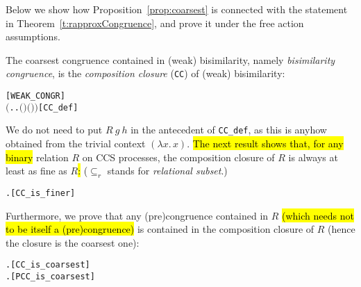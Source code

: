 Below we show how Proposition~\ref{prop:coarsest} is connected with
the statement in Theorem~\ref{t:rapproxCongruence}, and prove it under
the free action assumptions.

The coarsest congruence
contained in (weak) bisimilarity, namely \emph{bisimilarity
  congruence}, is
the \emph{composition closure} (\texttt{CC}) of (weak) bisimilarity:
\begin{alltt}
    \HOLSymConst{\HOLTokenDefEquality{}}  \hfill{[WEAK_CONGR]}
     \HOLSymConst{\HOLTokenDefEquality{}} \ensuremath{(}\HOLTokenLambda{} . \HOLSymConst{\HOLTokenForall{}}.   \HOLSymConst{\HOLTokenImp{}}  \ensuremath{(} \ensuremath{)} \ensuremath{(} \ensuremath{)}\ensuremath{)}\hfill{[CC_def]}
\end{alltt}
We do not need to put $R\ g\ h$ in the antecedent of
  \texttt{CC\_def}, as this is anyhow obtained from the trivial context $(\lambda x.\,x)$.
\hl{The next result shows that, for any binary} relation $R$ 
on CCS processes, the composition closure of $R$ is always at least as
fine as $R$\hl{:} ($\subseteq_r$ stands for \emph{relational subset}.)
\begin{alltt}
\HOLTokenTurnstile{} \HOLSymConst{\HOLTokenForall{}}.   \HOLSymConst{\HOLTokenRSubset{}} \hfill{[CC_is_finer]}
\end{alltt}
Furthermore, we prove that any (pre)congruence contained in $R$
\hl{(which needs not to be itself a (pre)congruence)}
is contained in the composition closure of $R$
(hence the closure is the coarsest one):
\begin{alltt}
\HOLTokenTurnstile{} \HOLSymConst{\HOLTokenForall{}} .   \HOLSymConst{\HOLTokenConj{}}  \HOLSymConst{\HOLTokenRSubset{}}  \HOLSymConst{\HOLTokenImp{}}  \HOLSymConst{\HOLTokenRSubset{}}  \hfill{[CC_is_coarsest]}
\HOLTokenTurnstile{} \HOLSymConst{\HOLTokenForall{}} .   \HOLSymConst{\HOLTokenConj{}}  \HOLSymConst{\HOLTokenRSubset{}}  \HOLSymConst{\HOLTokenImp{}}  \HOLSymConst{\HOLTokenRSubset{}}  \hfill{[PCC_is_coarsest]}
\end{alltt}

